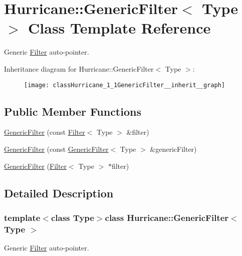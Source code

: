 \hypertarget{classHurricane_1_1GenericFilter}{\section{Hurricane\-:\-:Generic\-Filter$<$ Type $>$ Class Template Reference}
\label{classHurricane_1_1GenericFilter}
}


Generic \hyperlink{classHurricane_1_1Filter}{Filter} auto-\/pointer.  




Inheritance diagram for Hurricane\-:\-:Generic\-Filter$<$ Type $>$\-:\nopagebreak
\begin{figure}[H]
\begin{center}
\leavevmode
\texttt{[image: classHurricane\_1\_1GenericFilter\_\_inherit\_\_graph]}
\end{center}
\end{figure}
\subsection*{Public Member Functions}
\begin{DoxyCompactItemize}
\item 
\hyperlink{classHurricane_1_1GenericFilter_a1aae208fe9937dd3a6f706ceb8b3b9b4}{Generic\-Filter} (const \hyperlink{classHurricane_1_1Filter}{Filter}$<$ Type $>$ \&filter)
\item 
\hyperlink{classHurricane_1_1GenericFilter_adf44866e7507f45dd0d612743f2d9a71}{Generic\-Filter} (const \hyperlink{classHurricane_1_1GenericFilter}{Generic\-Filter}$<$ Type $>$ \&generic\-Filter)
\item 
\hyperlink{classHurricane_1_1GenericFilter_aac847f0c0d6ee640c54847e374287fe1}{Generic\-Filter} (\hyperlink{classHurricane_1_1Filter}{Filter}$<$ Type $>$ $\ast$filter)
\end{DoxyCompactItemize}


\subsection{Detailed Description}
\subsubsection*{template$<$class Type$>$class Hurricane\-::\-Generic\-Filter$<$ Type $>$}

Generic \hyperlink{classHurricane_1_1Filter}{Filter} auto-\/pointer. 

